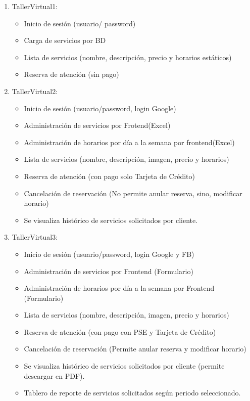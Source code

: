 \documentclass[10pt,a4paper,openany]{book}
\begin{document}
\begin{enumerate}
	\item TallerVirtual1:
	\begin{itemize}
		\item Inicio de sesión (usuario/ password)
		\item Carga de servicios por BD
		\item Lista de servicios (nombre, descripción, precio y horarios estáticos)
		\item Reserva de atención (sin pago)
	\end{itemize}
	\item TallerVirtual2:
	\begin{itemize}
		\item Inicio de sesión (usuario/password, login Google)
		\item Administración de servicios por Frotend(Excel)
		\item Administración de horarios por día a la semana por frontend(Excel)
		\item Lista de servicios (nombre, descripción, imagen, precio y horarios)
		\item Reserva de atención (con pago solo Tarjeta de Crédito)
		\item Cancelación de reservación (No permite anular reserva, sino, modificar horario)
		\item Se visualiza histórico de servicios solicitados por cliente.
	\end{itemize}
	\item TallerVirtual3:
	\begin{itemize}
		\item Inicio de sesión (usuario/password, login Google y FB)
		\item Administración de servicios por Frontend (Formulario)
		\item Administración de horarios por día a la semana por Frontend (Formulario)
		\item Lista de servicios (nombre, descripción, imagen, precio y horarios)
		\item Reserva de atención (con pago con PSE y Tarjeta de Crédito)
		\item Cancelación de reservación (Permite anular reserva y modificar horario)
		\item Se visualiza histórico de servicios solicitados por cliente (permite descargar en PDF).
		\item Tablero de reporte de servicios solicitados según periodo seleccionado.
	\end{itemize}
\end{enumerate}
\end{document}
